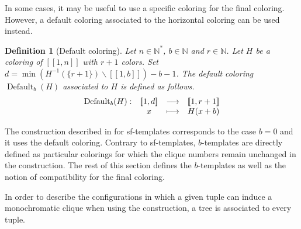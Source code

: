 \documentclass{article}
\newtheorem{definition}{Definition}[section]
\DeclareMathOperator{\coldef}{Default}
\begin{document}
In some cases, it may be useful to use a specific coloring for the final coloring. However, a default coloring 
associated to the horizontal coloring can be used instead.

\begin{definition}[Default coloring]
Let \(n \in \mathbb{N}^*\), \(b \in \mathbb{N}\) and \(r \in \mathbb{N}\). Let \(H\) be a coloring of \([\![1, n]\!]\) 
with \(r +1\) colors. Set \(d = \min \left(H^{-1}(\{r + 1\}) \backslash [\![1, b]\!] \right) - b  - 1\). The default 
coloring \(\coldef_b(H)\)  associated to \(H\) is defined as follows.
\[\begin{array}{c c c c}
	\coldef_b(H) : & [\![1, d]\!] & \longrightarrow & [\![1, r + 1]\!] \\
	 & x & \longmapsto & H(x + b)
\end{array}\]
\end{definition}

The construction described in \cite{RowleyRamsey} for sf-templates corresponds to the case \(b = 0\) and it uses the 
default coloring. Contrary to sf-templates, \(b\)-templates are directly defined as particular colorings for which the 
clique numbers remain unchanged in the construction. The rest of this section defines the \(b\)-templates as well as 
the notion of compatibility for the final coloring.

In order to describe the configurations in which a given tuple can induce a monochromatic clique when using the 
construction, a tree is associated to every tuple.
\end{document}

